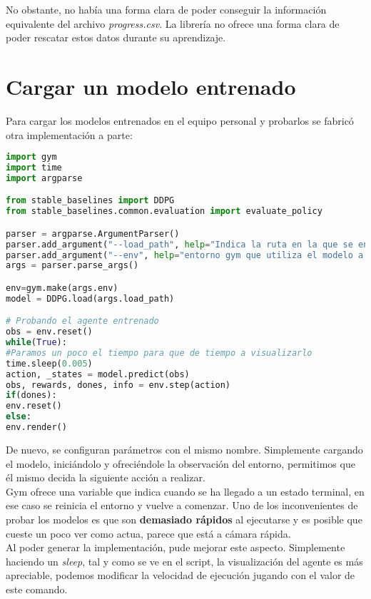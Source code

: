 \documentclass[11pt,fleqn]{book} %
\begin{document}
No obstante, no había una forma clara de poder conseguir la información equivalente del archivo \textit{progress.csv}. La librería no ofrece una forma clara de poder rescatar estos datos durante su aprendizaje.

\section{Cargar un modelo entrenado}

Para cargar los modelos entrenados en el equipo personal y probarlos se fabricó otra implementación a parte: \\

\begin{lstlisting}[language=python]
import gym
import time
import argparse

from stable_baselines import DDPG
from stable_baselines.common.evaluation import evaluate_policy

parser = argparse.ArgumentParser()
parser.add_argument("--load_path", help="Indica la ruta en la que se encuentra el modelo a cargar")
parser.add_argument("--env", help="entorno gym que utiliza el modelo a cargar")
args = parser.parse_args()

env=gym.make(args.env)
model = DDPG.load(args.load_path)

# Probando el agente entrenado
obs = env.reset()
while(True):
#Paramos un poco el tiempo para que de tiempo a visualizarlo
time.sleep(0.005)
action, _states = model.predict(obs)
obs, rewards, dones, info = env.step(action)
if(dones):
env.reset()
else:
env.render()
\end{lstlisting}

De nuevo, se configuran parámetros con el mismo nombre. Simplemente cargando el modelo, iniciándolo y ofreciéndole la observación del entorno, permitimos que él mismo decida la siguiente acción a realizar. \\

Gym ofrece una variable que indica cuando se ha llegado a un estado terminal, en ese caso se reinicia el entorno y vuelve a comenzar. Uno de los inconvenientes de probar los modelos es que son \textbf{demasiado rápidos} al ejecutarse y es posible que cueste un poco ver como actua, parece que está a cámara rápida. \\

Al poder generar la implementación, pude mejorar este aspecto. Simplemente haciendo un \textit{sleep}, tal y como se ve en el script, la visualización del agente es más apreciable, podemos modificar la velocidad de ejecución jugando con el valor de este comando.\\

\cleardoublepage %
\setlength{\columnsep}{0.75cm} %
\printindex %

\end{document}
